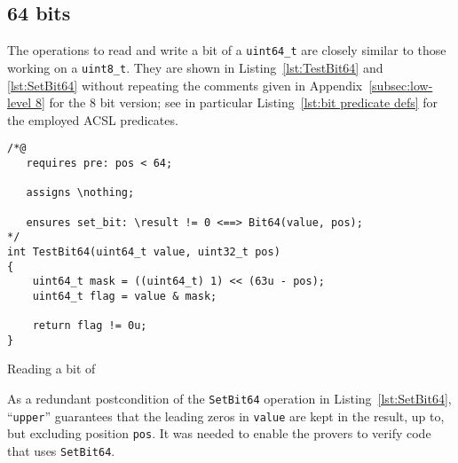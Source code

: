 \subsection{64 bits}
\label{subsec:low-level 64}



The operations to read and write a bit of a \lstinline{uint64_t} are closely similar to
those working on a \lstinline{uint8_t}.
%
They are shown in Listing~\ref{lst:TestBit64}
and \ref{lst:SetBit64} without repeating the comments given
in Appendix~\ref{subsec:low-level 8} for the 8 bit version; see in particular
Listing~\ref{lst:bit predicate defs} for the employed ACSL predicates.





\begin{listing}[hbt]
\begin{minipage}{0.99\textwidth}
\begin{lstlisting}[style=acsl-block]
/*@
   requires pre: pos < 64;

   assigns \nothing;

   ensures set_bit: \result != 0 <==> Bit64(value, pos);
*/
int TestBit64(uint64_t value, uint32_t pos)
{
    uint64_t mask = ((uint64_t) 1) << (63u - pos);
    uint64_t flag = value & mask;

    return flag != 0u;
}
\end{lstlisting}
\end{minipage}
\caption{\label{lst:TestBit64}Reading a bit of }
\end{listing}









As a redundant postcondition of the \lstinline{SetBit64} operation in
Listing~\ref{lst:SetBit64},
``\lstinline{upper}'' guarantees that the leading zeros in
\lstinline{value} are kept in the result, up to, but excluding position \lstinline{pos}.
%
It was needed to enable the provers to verify code that uses \lstinline{SetBit64}.




